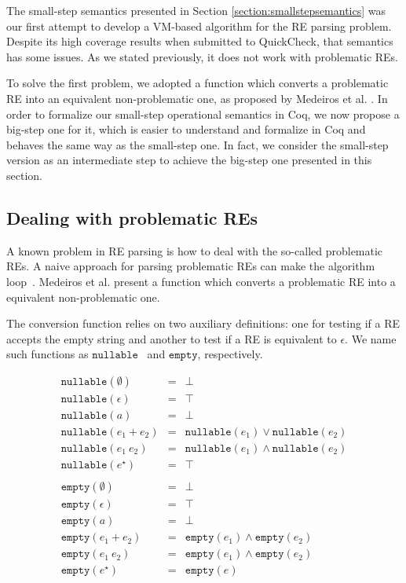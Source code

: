 \documentclass[oneside,12pt]{scrbook}
\theoremstyle{definition}
\newcommand{\nullable}{\ensuremath{\texttt{nullable}}}
\newcommand{\emptyy}{\ensuremath{\texttt{empty}}}
\theoremstyle{plain}
\theoremstyle{definition}
\begin{document}
The small-step semantics presented in Section \ref{section:smallstepsemantics} was our first attempt to develop a VM-based algorithm for the RE parsing problem. Despite its high coverage results when submitted to QuickCheck, that semantics has some issues. As we stated previously, it does not work with problematic REs.

To solve the first problem, we adopted a function which converts a problematic RE into an equivalent non-problematic one, as proposed by Medeiros et al. \cite{Medeiros14}. In order to formalize our small-step operational semantics in Coq, we now propose a big-step one for it, which is easier to understand and formalize in Coq and behaves the same way as the small-step one. In fact, we consider the small-step version as an intermediate step to achieve the big-step one presented in this section.

\subsection{Dealing with problematic REs}\label{subsection:problematic}

A known problem in RE parsing is how to deal with the so-called problematic REs. A naive approach for 
parsing problematic REs can make the algorithm loop~\cite{Frisch2004}. Medeiros et al. \cite{Medeiros14}
present a function which converts a problematic RE into a equivalent non-problematic one.

The conversion function relies on two auxiliary definitions: one for testing if a RE accepts the empty string and 
another to test if a RE is equivalent to $\epsilon$. We name such functions as \nullable~ and \emptyy, 
respectively.

\[
\begin{array}{lcl}
\nullable(\emptyset) & = & \bot \\ 
\nullable(\epsilon)  & = & \top \\
\nullable(a)         & = & \bot \\ 
\nullable(e_1 + e_2) & = & \nullable(e_1)\lor\nullable(e_2)\\
\nullable(e_1\:e_2)  & = & \nullable(e_1)\land\nullable(e_2)\\
\nullable(e ^\star)  & = & \top \\
\\
\emptyy(\emptyset)    & = & \bot \\ 
\emptyy(\epsilon)     & = & \top \\
\emptyy(a)            & = & \bot \\
\emptyy(e_1 + e_2)    & = & \emptyy(e_1) \land \emptyy(e_2)\\
\emptyy(e_1\:e_2)     & = & \emptyy(e_1) \land \emptyy(e_2)\\
\emptyy(e ^\star)     & = & \emptyy(e)\\        
\end{array}
\]
\end{document}
